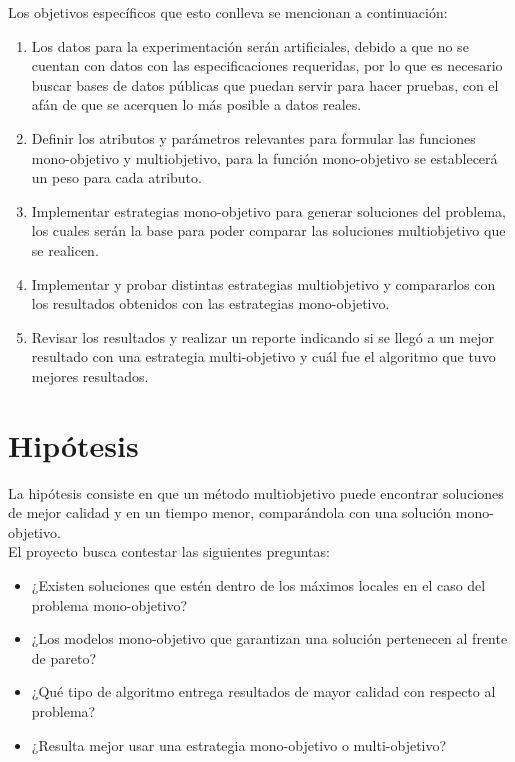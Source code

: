 Los objetivos específicos que esto conlleva se mencionan a continuación:

\begin{enumerate}

\item Los datos para la experimentación serán artificiales, debido a que no se cuentan con datos con las especificaciones requeridas, por lo que es necesario buscar bases de datos públicas que puedan servir para hacer pruebas, con el afán de que se acerquen lo más posible a datos reales.

\item Definir los atributos y parámetros relevantes para formular las funciones mono-objetivo y multiobjetivo, para la función mono-objetivo se establecerá un peso para cada atributo.

\item Implementar estrategias mono-objetivo para generar soluciones del problema, los cuales serán la base para poder comparar las soluciones multiobjetivo que se realicen. 

\item Implementar y probar distintas estrategias multiobjetivo y compararlos con los resultados obtenidos con las estrategias mono-objetivo.

\item Revisar los resultados y realizar un reporte indicando si se llegó a un mejor resultado con una estrategia multi-objetivo y cuál fue el algoritmo que tuvo mejores resultados.
\end{enumerate}
\clearpage
\section{Hipótesis}

La hipótesis consiste en que un método multiobjetivo puede encontrar soluciones de mejor calidad y en un tiempo menor, comparándola con una solución mono-objetivo.\\

El proyecto busca contestar las siguientes preguntas:

\begin{itemize}

\item ¿Existen soluciones que estén dentro de los máximos locales en el caso del problema mono-objetivo?

\item ¿Los modelos mono-objetivo que garantizan una solución pertenecen al frente de pareto?

\item ¿Qué tipo de algoritmo entrega resultados de mayor calidad con respecto al problema?

\item ¿Resulta mejor usar una estrategia mono-objetivo o multi-objetivo?

\end{itemize}


